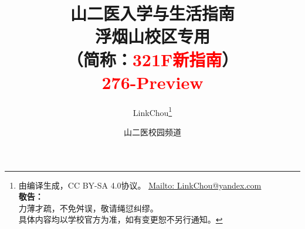

\title{%
\normalsize
{\Huge\textbf{山二医入学与生活指南}}\\[6pt]
{\large\textbf{浮烟山校区专用}}\\
（简称：\textcolor{red}{321F新指南}）\\[15pt]
{\large\textcolor{red}{276-Preview}}\vspace*{-25pt}}
\author{LinkChou\thanks{由\LaTeXe 编译生成，CC BY-SA 4.0协议。%
        \uline{\href{Mailto:LinkChou@yandex.com}{Mailto: LinkChou@yandex.com}}\\%
        \textbf{敬告：}\\%
        \indent\indent 力薄才疏，不免舛误，敬请绳愆纠缪。\\%
        \indent\indent 具体内容均以学校官方为准，如有变更恕不另行通知。}\and 山二医校园频道}
\date{\DTMnow}
\maketitle

\renewcommand{\thefootnote}{\arabic{footnote}}

\tableofcontents